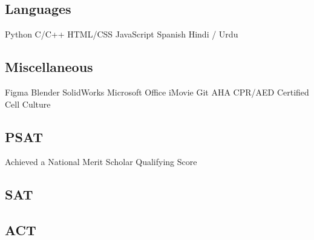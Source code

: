 \documentclass[a4paper]{MagicalCV}
\begin{document}
\begin{minipage}[t]{0.33\textwidth}
\sectionsep


\subsection{Languages}
Python \textbullet{}  C/C++ \textbullet{} HTML/CSS  \textbullet{}
JavaScript \textbullet{} Spanish \textbullet{} Hindi / Urdu

\sectionsep
\subsection{Miscellaneous}
Figma \textbullet{} Blender \textbullet{} SolidWorks \textbullet{} Microsoft Office \textbullet{} iMovie \textbullet{} Git \textbullet{} AHA CPR/AED Certified \textbullet{} Cell Culture
\sectionsep


\subsection{PSAT}
\vspace{\topsep} %
Achieved a National Merit Scholar Qualifying Score
\sectionsep

\subsection{SAT}
\vspace{\topsep} %
\sectionsep

\subsection{ACT}
\vspace{\topsep} %
\sectionsep

\end{minipage} 
\hfill
\end{document}
